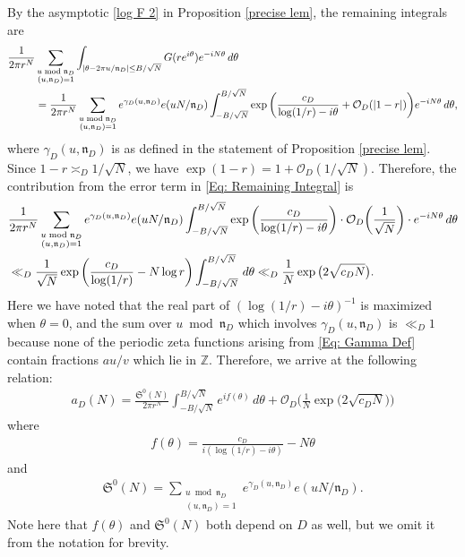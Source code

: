 \documentclass[11pt]{amsart}
\numberwithin{equation}{section}
\newcommand{\mf}{\mathfrak}
\theoremstyle{remark}
\begin{document}
 By the asymptotic \eqref{log F 2} in Proposition \ref{precise lem}, the remaining integrals are 
\begin{align}\label{Eq: Remaining Integral}
\frac{1}{2\pi r^N}&\sum_{\substack{u \bmod \mf{n}_D \\ (u,\mf{n}_D)=1}}\int_{|\theta-2\pi u/\mf{n}_D|\leq B/\sqrt{N}} G(re^{i\theta})e^{-iN\theta}\, d\theta
\notag \\
&=
\frac{1}{2\pi r^N}\sum_{\substack{u \bmod \mf{n}_D \\ (u,\mf{n}_D)=1}}{e^{\gamma_D(u,\mf{n}_D)}e(uN/\mf{n}_D)}\int_{-B/\sqrt{N}}^{B/\sqrt{N}} \exp\bigg(\frac{c_D}{\log(1/r)-i\theta}+\mathcal{O}_D(|1-r|)\bigg)e^{-iN\theta} \, d\theta,
\end{align}
where $\gamma_D(u,\mf{n}_D)$ is as defined in the statement of Proposition \ref{precise lem}. Since $1-r \asymp_{D} 1/\sqrt{N}$, we have $\exp(1-r) = 1 +\mathcal{O}_D(1/\sqrt{N})$. Therefore, the contribution from the error term in \eqref{Eq: Remaining Integral} is
\begin{align}\label{worst error}
&\frac{1}{2\pi r^N}\sum_{\substack{u \bmod \mf{n}_D \\ (u,\mf{n}_D)=1}}{e^{\gamma_D(u,\mf{n}_D)}e(uN/\mf{n}_D)}\int_{-B/\sqrt{N}}^{B/\sqrt{N}} \exp\bigg(\frac{c_D}{\log(1/r)-i\theta}\bigg) \cdot \mathcal{O}_D\bigg(\frac{1}{\sqrt{N}}\bigg) \cdot e^{-iN\theta} \, d\theta \notag \\
&\ll_D \frac{1}{\sqrt{N}}\exp\bigg(\frac{c_D}{\log(1/r)}-N\log r\bigg)\int_{-B/\sqrt{N}}^{B/\sqrt{N}} \, d\theta
\ll_D
\frac{1}{N}\exp\big(2\sqrt{c_DN}\big).
\end{align}
Here we have noted that the real part of $(\log(1/r)-i\theta)^{-1}$ is maximized when $\theta=0$, and the sum over $u \bmod \mf{n}_D$ which involves $\gamma_D(u,\mf{n}_D)$ is $\ll_D 1$ because none of the periodic zeta functions arising from \eqref{Eq: Gamma Def} contain fractions $au/v$ which lie in $\mathbb{Z}$. Therefore, we arrive at the following relation: 
\begin{align}\label{Eq: Fourier Coefficient Formula}
a_D(N)
=
\frac{\mf{S}^{0}(N)}{2\pi r^N}\int_{-B/\sqrt{N}}^{B/\sqrt{N}} e^{if(\theta)} \, d\theta
+
\mathcal{O}_D\bigg(\frac{1}{N}\exp\big(2\sqrt{c_DN}\big)\bigg)
\end{align}
where
\begin{align}\label{Eq: ftheta def}
f(\theta)=\frac{c_D}{ i(\log(1/r)-i\theta)}-N\theta
\end{align}
and 
\begin{align}\label{Eq: Sigma Def}
\mf{S}^{0}(N)= \sum_{\substack{u \bmod \mf{n}_D \\ (u,\mf{n}_D)=1}}{e^{\gamma_{D}(u,\mf{n}_D)}e(uN/\mf{n}_D)}.
\end{align}
Note here that $f(\theta)$ and $\mf{S}^{0}(N)$ both depend on $D$ as well, but we omit it from the notation for brevity.
\end{document}
